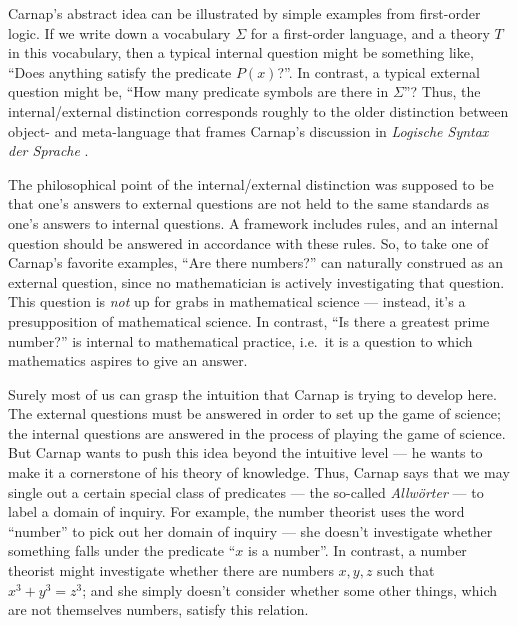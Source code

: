 Carnap's abstract idea can be illustrated by simple examples from
first-order logic.  If we write down a vocabulary $\Sigma$ for a
first-order language, and a theory $T$ in this vocabulary, then a
typical internal question might be something like, ``Does anything
satisfy the predicate $P(x)$?''.  In contrast, a typical external
question might be, ``How many predicate symbols are there in
$\Sigma$''?  Thus, the internal/external distinction corresponds
roughly to the older distinction between object- and meta-language
that frames Carnap's discussion in {\it Logische Syntax der Sprache}
\citeyearpar{carnap1934}.

The philosophical point of the internal/external distinction was
supposed to be that one's answers to external questions are not held
to the same standards as one's answers to internal questions.  A
framework includes rules, and an internal question should be answered
in accordance with these rules.  So, to take one of Carnap's favorite
examples, ``Are there numbers?''  can naturally construed as an
external question, since no mathematician is actively investigating
that question.  This question is {\it not} up for grabs in
mathematical science --- instead, it's a presupposition of
mathematical science.  In contrast, ``Is there a greatest prime
number?'' is internal to mathematical practice, i.e.\ it is a question
to which mathematics aspires to give an answer.

Surely most of us can grasp the intuition that Carnap is trying to
develop here.  The external questions must be answered in order to set
up the game of science; the internal questions are answered in the
process of playing the game of science.  But Carnap wants to push this
idea beyond the intuitive level --- he wants to make it a cornerstone
of his theory of knowledge.  Thus, Carnap says that we may single out
a certain special class of predicates --- the so-called {\it
  Allw\"orter} --- to label a domain of inquiry.  For example, the
number theorist uses the word ``number'' to pick out her domain of
inquiry --- she doesn't investigate whether something falls under the
predicate ``$x$ is a number''.  In contrast, a number theorist might
investigate whether there are numbers $x,y,z$ such that $x^3+y^3=z^3$;
and she simply doesn't consider whether some other things, which are
not themselves numbers, satisfy this relation.

